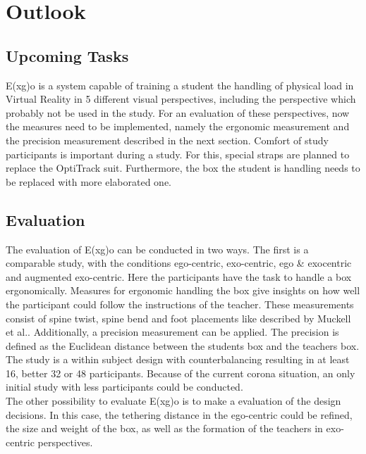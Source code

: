 \chapter{Outlook}

\section{Upcoming Tasks}
E(x\textbar g)o is a system capable of training a student the handling of physical load in Virtual Reality in 5 different visual perspectives, including the perspective which probably not be used in the study. For an evaluation of these perspectives, now the measures need to be implemented, namely the ergonomic measurement and the precision measurement described in the next section. Comfort of study participants is important during a study. For this, special straps are planned to replace the OptiTrack suit. Furthermore, the box the student is handling needs to be replaced with more elaborated one.

\section{Evaluation}
The evaluation of E(x\textbar g)o can be conducted in two ways. The first is a comparable study, with the conditions ego-centric, exo-centric, ego \& exocentric and augmented exo-centric. Here the participants have the task to handle a box ergonomically. Measures for ergonomic handling the box give insights on how well the participant could follow the instructions of the teacher. These measurements consist of spine twist, spine bend and foot placements like described by Muckell et al.\cite{Muckell2017}. Additionally, a precision measurement can be applied. The precision is defined as the Euclidean distance between the students box and the teachers box. The study is a within subject design with counterbalancing resulting in at least 16, better 32 or 48 participants. Because of the current corona situation, an only initial study with less participants could be conducted.\\
The other possibility to evaluate E(x\textbar g)o is to make a evaluation of the design decisions. In this case, the tethering distance in the ego-centric could be refined, the size and weight of the box, as well as the formation of the teachers in exo-centric perspectives.
